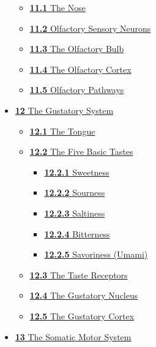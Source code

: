 \begin{itemize}
  \begin{itemize}
  \tightlist
  \item
    \href{the-olfactory-system.html\#the-nose}{\emph{}\textbf{11.1} The
    Nose}
  \item
    \href{the-olfactory-system.html\#olfactory-sensory-neurons}{\emph{}\textbf{11.2}
    Olfactory Sensory Neurons}
  \item
    \href{the-olfactory-system.html\#the-olfactory-bulb}{\emph{}\textbf{11.3}
    The Olfactory Bulb}
  \item
    \href{the-olfactory-system.html\#the-olfactory-cortex}{\emph{}\textbf{11.4}
    The Olfactory Cortex}
  \item
    \href{the-olfactory-system.html\#olfactory-pathways}{\emph{}\textbf{11.5}
    Olfactory Pathways}
  \end{itemize}
\item
  \href{the-gustatory-system.html}{\emph{}\textbf{12} The Gustatory
  System}

  \begin{itemize}
  \tightlist
  \item
    \href{the-gustatory-system.html\#the-tongue}{\emph{}\textbf{12.1}
    The Tongue}
  \item
    \href{the-gustatory-system.html\#the-five-basic-tastes}{\emph{}\textbf{12.2}
    The Five Basic Tastes}

    \begin{itemize}
    \tightlist
    \item
      \href{the-gustatory-system.html\#sweetness}{\emph{}\textbf{12.2.1}
      Sweetness}
    \item
      \href{the-gustatory-system.html\#sourness}{\emph{}\textbf{12.2.2}
      Sourness}
    \item
      \href{the-gustatory-system.html\#saltiness}{\emph{}\textbf{12.2.3}
      Saltiness}
    \item
      \href{the-gustatory-system.html\#bitterness}{\emph{}\textbf{12.2.4}
      Bitterness}
    \item
      \href{the-gustatory-system.html\#savoriness-umami}{\emph{}\textbf{12.2.5}
      Savoriness (Umami)}
    \end{itemize}
  \item
    \href{the-gustatory-system.html\#the-taste-receptors}{\emph{}\textbf{12.3}
    The Taste Receptors}
  \item
    \href{the-gustatory-system.html\#the-gustatory-nucleus}{\emph{}\textbf{12.4}
    The Gustatory Nucleus}
  \item
    \href{the-gustatory-system.html\#the-gustatory-cortex}{\emph{}\textbf{12.5}
    The Gustatory Cortex}
  \end{itemize}
\item
  \href{the-somatic-motor-system.html}{\emph{}\textbf{13} The Somatic
  Motor System}


\end{itemize}
